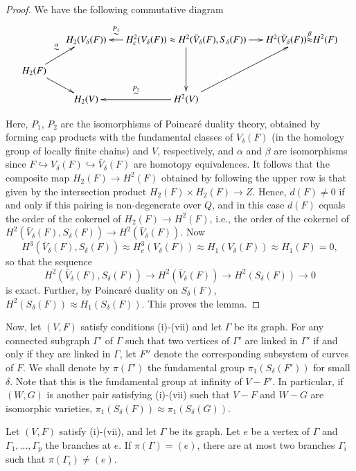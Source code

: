 \begin{proof}
We have the following commutative diagram 
{\fontsize{9}{11}\selectfont
\[
\xymatrix@C=.5cm@R=.5cm{
& H_2 (V_\delta (F)) & H^2_c (V_\delta (F)) \ar[dd] \ar[l]_-{\displaystyle\mathop\sim^{P_1}} \approx  H^2 (\bar{V}_\delta (F), S_\delta (F))  \ar[r] & H^2 (\bar{V}_\delta(F)) \displaystyle{\mathop{\approx}^\beta} H^2 (F)\\
H_2 (F) \ar[ur]^{\displaystyle\mathop\sim^\alpha} \ar[dr] & & &\\
& H_2 (V) & H^2 (V) \ar[l]_{\displaystyle\mathop\sim^{P_2}} \ar[uur] &  
}
\]}\relax

Here, $P_1$, $P_2$ are the isomorphisms of Poincar\'e duality theory, obtained by forming cap products with the fundamental classes of $V_\delta (F)$ (in the homology group of locally finite chains) and $V$, respectively, and $\alpha$ and $\beta$ are isomorphisms since $F \hookrightarrow V_\delta (F) \hookrightarrow \bar{V}_\delta (F)$ are homotopy equivalences. It follows that the composite map $H_2 (F) \to H^2 (F)$ obtained by following the upper row is that given by the intersection product $H_2 (F) \times H_2 (F) \to Z$. Hence, $d(F) \neq 0$ if and only if this pairing is non-degenerate over $Q$, and in this case $d(F)$ equals the order of the cokernel of $H_2 (F) \to H^2 (F)$, i.e., the order of the cokernel of $H^2 (\bar{V}_\delta (F), S_\delta (F)) \to H^2 (\bar{V}_\delta (F))$. Now
$$
H^3 (\bar{V}_\delta (F), S_\delta (F)) \approx H^3_c (V_\delta (F)) \approx H_1 (V_\delta (F)) \approx H_1 (F) = 0, 
$$
so that the sequence
$$
H^2 (\bar{V}_\delta (F), S_\delta (F)) \to H^2 (\bar{V}_\delta (F)) \to H^2 (S_\delta (F)) \to 0
$$
is exact. Further, by Poincar\'e duality on $S_\delta (F)$, $H^2 (S_\delta (F)) \approx H_1 (S_\delta (F))$. This proves the lemma.
\end{proof}

Now, let $(V,F)$ satisfy conditions (i)-(vii) and let $\Gamma$ be its graph. For any connected subgraph $\Gamma'$ of $\Gamma$ such that two vertices of $\Gamma'$ are linked in $\Gamma'$ if and only if they are linked in $\Gamma$, let $F''$ denote the corresponding subsystem of curves of $F$. We shall denote by $\pi (\Gamma')$ the fundamental group $\pi_1 (S_\delta (F'))$ for small $\delta$. Note that this is the fundamental group at infinity of $V - F'$. In particular, if $(W,G)$ is another pair satisfying (i)-(vii) such that $V -F$ and $W - G$ are isomorphic varieties, $\pi_1 (S_\delta (F)) \approx \pi_1 (S_\delta (G))$.


\begin{lem}\label{art8-lem4}%
Let $(V,F)$ satisfy (i)-(vii), and let $\Gamma$ be its graph. Let $e$ be a vertex of $\Gamma$ and $\Gamma_1, \ldots, \Gamma_p$ the branches at $e$. If $\pi(\Gamma) = (e)$, there are at most two branches $\Gamma_i$ such that $\pi(\Gamma_i) \neq (e)$.
\end{lem}

